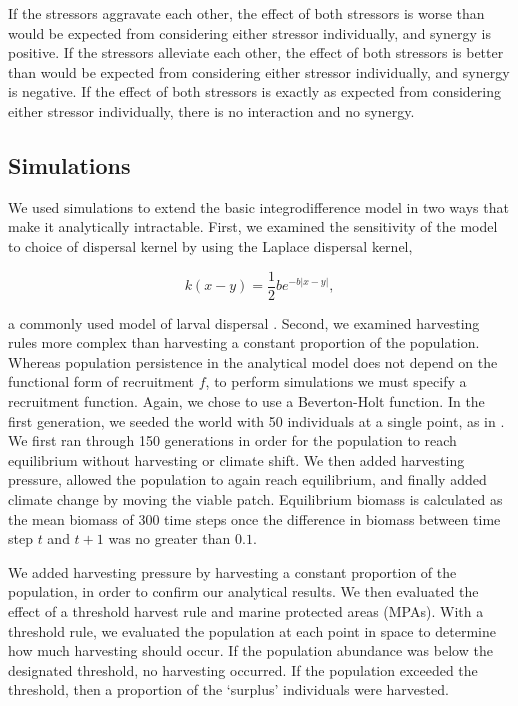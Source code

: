 \documentclass[12pt,english]{article}
\begin{document}
\begin{spacing}{1.9}
\begin{flushleft}
\noindent If the stressors aggravate each other, the effect of both stressors is worse than would be expected from 
considering either stressor individually, and synergy is positive. If the stressors alleviate each other, the effect 
of both stressors is better than would be expected from considering either stressor individually, and synergy is 
negative. If the effect of both stressors is exactly as expected from considering either stressor individually, 
there is no interaction and no synergy.

\subsection{Simulations }

We used simulations to extend the basic integrodifference model in two ways that make it analytically 
intractable. First, we examined the sensitivity of the model to choice of dispersal kernel by using the Laplace 
dispersal kernel, 

\[ k(x-y)=\frac{1}{2}be^{-b|x-y|},\]

\noindent a commonly used model of larval dispersal \citep{Pinsky:2011fk}.  Second, we examined harvesting rules more complex than harvesting a constant proportion of the population. Whereas population persistence in the analytical model does not depend on the functional form of recruitment $f$, to perform simulations we must 
specify a recruitment function.  Again, we chose to use a Beverton-Holt function.  In the first generation, we seeded the world with 50 individuals at a single point, as in \citep{ZhouKot2011}. We first ran through 150 generations in order for the population to reach equilibrium without harvesting or climate shift.  We then added harvesting pressure, allowed the population to again reach equilibrium, and finally added climate change by moving the viable patch.  Equilibrium biomass is calculated as the mean biomass of 300 time steps once the difference in biomass between time step $t$ and $t+1$ was no greater than $0.1$.  

We added harvesting pressure by harvesting a constant proportion of the population, in order to confirm our analytical results. We then evaluated the effect of a threshold harvest rule and marine protected 
areas (MPAs).  With a threshold rule, we evaluated the population at each point in space to determine how 
much harvesting should occur. If the population abundance was below the designated threshold, no 
harvesting occurred. If the population exceeded the threshold, then a proportion of the `surplus' individuals 
were harvested.


\end{flushleft}
\end{spacing}
\end{document}
